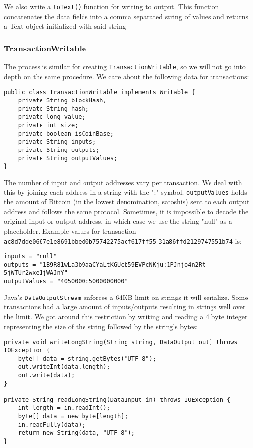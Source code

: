 \documentclass[9pt,twocolumn,twoside]{idsi}
\begin{document}
We also write a \lstinline{toText()} function for writing to output. This function concatenates the data fields into a comma separated string of values and returns a Text object initialized with said string.

\subsubsection{TransactionWritable}
The process is similar for creating \lstinline{TransactionWritable}, so we will not go into depth on the same procedure. We care about the following data for transactions:

\begin{lstlisting}
public class TransactionWritable implements Writable {
    private String blockHash;
    private String hash;
    private long value;
    private int size;
    private boolean isCoinBase;
    private String inputs;
    private String outputs;
    private String outputValues;
}
\end{lstlisting}

The number of input and output addresses vary per transaction. We deal with this by joining each address in a string with the ":" symbol. \lstinline{outputValues} holds the amount of Bitcoin (in the lowest denomination, satoshis) sent to each output address and follows the same protocol. Sometimes, it is impossible to decode the original input or output address, in which case we use the string "null" as a placeholder. Example values for transaction \lstinline{ac8d7dde0667e1e8691bbed0b75742275acf617ff55} \lstinline{31a86ffd2129747551b74} is:

\begin{lstlisting}
inputs = "null"
outputs = "1B9R81wLa3b9aaCYaLtKGUcb59EVPcNKju:1PJnjo4n2Rt
5jWTUr2wxe1jWAJnY"
outputValues = "4050000:5000000000"
\end{lstlisting}

Java's \lstinline{DataOutputStream} enforces a 64KB limit on strings it will serialize. Some transactions had a large amount of inputs/outputs resulting in strings well over the limit. We got around this restriction by writing and reading a 4 byte integer representing the size of the string followed by the string's bytes:

\begin{lstlisting}
private void writeLongString(String string, DataOutput out) throws IOException {
    byte[] data = string.getBytes("UTF-8");
    out.writeInt(data.length);
    out.write(data);
}

private String readLongString(DataInput in) throws IOException {
    int length = in.readInt();
    byte[] data = new byte[length];
    in.readFully(data);
    return new String(data, "UTF-8");
}
\end{lstlisting}
\end{document}
